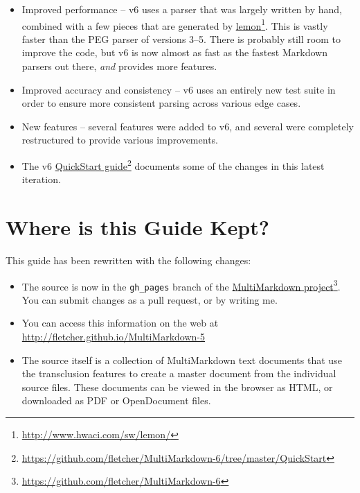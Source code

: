 \begin{itemize}
\item Improved performance -- v6 uses a parser that was largely written by hand, combined with a few pieces that are generated by \href{http://www.hwaci.com/sw/lemon/}{lemon}\footnote{\href{http://www.hwaci.com/sw/lemon/}{http:\slash \slash www.hwaci.com\slash sw\slash lemon\slash }}. This is vastly faster than the PEG parser of versions 3--5. There is probably still room to improve the code, but v6 is now almost as fast as the fastest Markdown parsers out there, \emph{and} provides more features.

\item Improved accuracy and consistency -- v6 uses an entirely new test suite in order to ensure more consistent parsing across various edge cases.

\item New features -- several features were added to v6, and several were completely restructured to provide various improvements.

\item The v6 \href{https://github.com/fletcher/MultiMarkdown-6/tree/master/QuickStart}{QuickStart guide}\footnote{\href{https://github.com/fletcher/MultiMarkdown-6/tree/master/QuickStart}{https:\slash \slash github.com\slash fletcher\slash MultiMarkdown-6\slash tree\slash master\slash QuickStart}} documents some of the changes in this latest iteration.

\end{itemize}

\section{Where is this Guide Kept? }
\label{whereisthisguidekept}

This guide has been rewritten with the following changes:

\begin{itemize}
\item The source is now in the \texttt{gh\_pages} branch of the \href{https://github.com/fletcher/MultiMarkdown-6}{MultiMarkdown project}\footnote{\href{https://github.com/fletcher/MultiMarkdown-6}{https:\slash \slash github.com\slash fletcher\slash MultiMarkdown-6}}. You can submit changes as a pull request, or by writing me.

\item You can access this information on the web at \href{http://fletcher.github.io/MultiMarkdown-5}{http:\slash \slash fletcher.github.io\slash MultiMarkdown-5}

\item The source itself is a collection of MultiMarkdown text documents that use the transclusion features to create a master document from the individual source files. These documents can be viewed in the browser as HTML, or downloaded as PDF or OpenDocument files.

\end{itemize}

